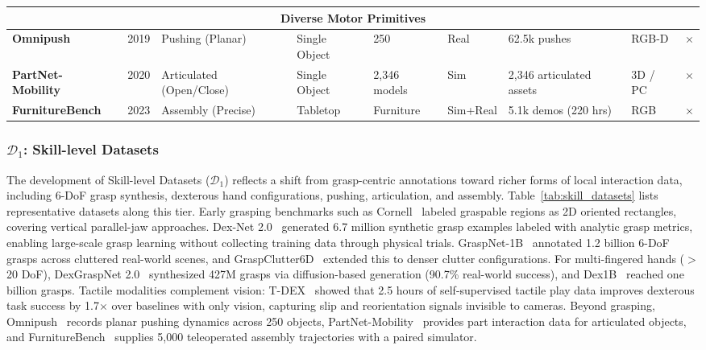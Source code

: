 \documentclass[acmsmall,screen,review]{acmart}
\begin{document}
\begin{table}[!t]
{\begin{tabular}{l l l l l l l l l}
\midrule
\multicolumn{9}{c}{\textbf{Diverse Motor Primitives}} \\
\midrule
\textbf{Omnipush}~\cite{bauza2021omnipush} & 2019 & Pushing (Planar) & Single Object & 250 & Real & 62.5k pushes & RGB-D & $\times$ \\
\textbf{PartNet-Mobility}~\cite{xiang2020sapien} & 2020 & Articulated (Open/Close) & Single Object & 2,346 models & Sim & 2,346 articulated assets & 3D / PC & $\times$ \\
\textbf{FurnitureBench}~\cite{heo2023furniturebench} & 2023 & Assembly (Precise) & Tabletop & Furniture & Sim+Real & 5.1k demos (220 hrs) & RGB & $\times$ \\
\bottomrule
\end{tabular}
}
\end{table}

\subsubsection{$\mathcal{D}_1$: Skill-level Datasets}\label{sec:skill_datasets_narrative}

The development of Skill-level Datasets (\(\mathcal{D}_1\)) reflects a shift from grasp-centric annotations toward richer forms of local interaction data, including 6-DoF grasp synthesis, dexterous hand configurations, pushing, articulation, and assembly.
Table~\ref{tab:skill_datasets} lists representative datasets along this tier.
Early grasping benchmarks such as Cornell~\cite{lenz2014deep} labeled graspable regions as 2D oriented rectangles, covering vertical parallel-jaw approaches.
Dex-Net 2.0~\cite{mahler2017dex} generated 6.7 million synthetic grasp examples labeled with analytic grasp metrics, enabling large-scale grasp learning without collecting training data through physical trials.
GraspNet-1B~\cite{fang2020graspnet} annotated 1.2 billion 6-DoF grasps across cluttered real-world scenes, and GraspClutter6D~\cite{back2025graspclutter6d} extended this to denser clutter configurations.
For multi-fingered hands ($>$20 DoF), DexGraspNet 2.0~\cite{zhang2024dexgraspnet20learninggenerative} synthesized 427M grasps via diffusion-based generation (90.7\% real-world success), and Dex1B~\cite{ye2025dex1b} reached one billion grasps.
Tactile modalities complement vision: T-DEX~\cite{guzey2023tdex} showed that 2.5 hours of self-supervised tactile play data improves dexterous task success by 1.7$\times$ over baselines with only vision, capturing slip and reorientation signals invisible to cameras.
Beyond grasping, Omnipush~\cite{bauza2021omnipush} records planar pushing dynamics across 250 objects, PartNet-Mobility~\cite{xiang2020sapien} provides part interaction data for articulated objects, and FurnitureBench~\cite{heo2023furniturebench} supplies 5,000 teleoperated assembly trajectories with a paired simulator.
\end{document}

